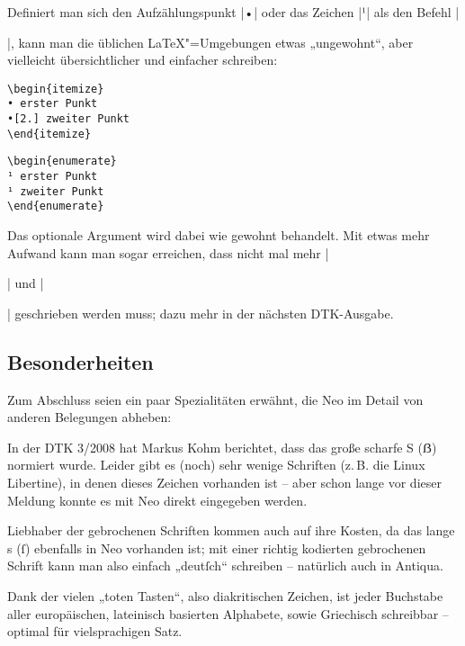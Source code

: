 \documentclass[ngerman]{dtk}
\begin{document}
{Definiert man sich den Aufzählungspunkt |•| oder das Zeichen |¹| als den Befehl |\item|, kann man die üblichen \LaTeX"=Umgebungen etwas „ungewohnt“, aber vielleicht übersichtlicher und einfacher schreiben:

\begin{minipage}{.4\textwidth}
\begin{verbatim}
\begin{itemize}
• erster Punkt
•[2.] zweiter Punkt
\end{itemize} 
\end{verbatim}
\end{minipage}
\hfill
\begin{minipage}{.4\textwidth}
\begin{verbatim}
\begin{enumerate}
¹ erster Punkt
¹ zweiter Punkt
\end{enumerate} 
\end{verbatim}
\end{minipage}

Das optionale Argument wird dabei wie gewohnt behandelt. Mit etwas mehr Aufwand kann man sogar erreichen, dass nicht mal mehr |\begin{itemize}| und |\end{itemize}| geschrieben werden muss; dazu mehr in der nächsten DTK-Ausgabe.

\subsection{Besonderheiten}
Zum Abschluss seien ein paar Spezialitäten erwähnt, die Neo im Detail von anderen Belegungen abheben:

In der DTK 3/2008 hat Markus Kohm berichtet, dass das große scharfe S (ẞ) normiert wurde. Leider gibt es (noch) sehr wenige Schriften (z.\,B. die Linux Libertine), in denen dieses Zeichen vorhanden ist – aber schon lange vor dieser Meldung konnte es mit Neo direkt eingegeben werden.

Liebhaber der gebrochenen Schriften kommen auch auf ihre Kosten, da das lange s (ſ) ebenfalls in Neo vorhanden ist; mit einer richtig kodierten gebrochenen Schrift kann man also einfach „deutſch“ schreiben – natürlich auch in Antiqua.

Dank der vielen „toten Tasten“, also diakritischen Zeichen, ist jeder Buchstabe aller europäischen, lateinisch basierten Alphabete, sowie Griechisch schreibbar – optimal für vielsprachigen Satz.

}
\end{document}
